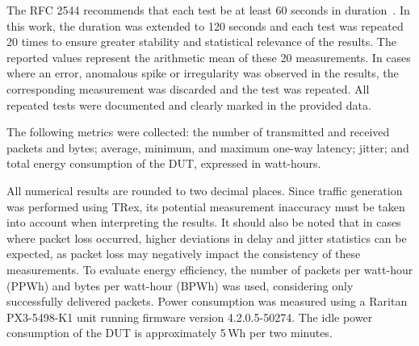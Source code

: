 The RFC 2544 recommends that each test be at least 60 seconds in duration~\cite{rfc2544}. 
In this work, the duration was extended to 120 seconds and each test was repeated 20 times to ensure greater stability and statistical relevance of the results. 
The reported values represent the arithmetic mean of these 20 measurements.
In cases where an error, anomalous spike or irregularity was observed in the results, the corresponding measurement was discarded and the test was repeated. 
All repeated tests were documented and clearly marked in the provided data.

The following metrics were collected: the number of transmitted and received packets and bytes; average, minimum, and maximum one-way latency; jitter; 
and total energy consumption of the DUT, expressed in watt-hours.

All numerical results are rounded to two decimal places.
Since traffic generation was performed using TRex, its potential measurement inaccuracy must be taken into account when interpreting the results.
It should also be noted that in cases where packet loss occurred, higher deviations in delay and jitter statistics can be expected, as packet loss may negatively impact the consistency of these measurements.
To evaluate energy efficiency, the number of packets per watt-hour (PPWh) and bytes per watt-hour (BPWh) was used, considering only successfully delivered packets.
Power consumption was measured using a Raritan PX3-5498-K1 unit running firmware version 4.2.0.5-50274.
The idle power consumption of the DUT is approximately 5 Wh per two minutes.

